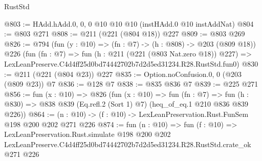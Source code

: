\begin{lexlean}{RustStd}
\begin{coremodule}
@803 := HAdd.hAdd.{0, 0, 0} @10 @10 @10 (instHAdd.{0} @10 instAddNat)
@804 := @803 @271
@808 := @211 (@221 (@804 @18)) @227
@809 := @803 @269
@826 := @794
    (fun (y : @10) => (fn : @7) -> (h : @808) -> @203 (@809 @18))
    @226
    (fun (fn : @7) =>
    fun (h : @211 (@221 (@803 Nat.zero @18)) @227) =>
    LexLeanPreserve.C4d4ff25d0bd74442702b7d2d5ed31234.R28.RustStd.fun0)
@830 := @211 (@221 (@804 @23)) @227
@835 := Option.noConfusion.{0, 0} (@203 (@809 @23)) @7
@836 := @128 @7
@838 := @835 @836 @7
@839 := @225 @271
@856 := fun (x : @10) =>
  @826
    (fun (x : @10) =>
    fun (fn : @7) =>
    fun (h : @830) => @838 @839 (Eq.refl.{2} (Sort 1) @7) (heq_of_eq.{1} @210 @836 @839 @226))
@864 := (n : @10) -> (f : @10) -> LexLeanPreservation.Rust.FunSem @198 @200 @202 @271 @226
@874 := fun (n : @10) =>
  fun (f : @10) =>
  LexLeanPreservation.Rust.simulate
    @198
    @200
    @202
    LexLeanPreserve.C4d4ff25d0bd74442702b7d2d5ed31234.R28.RustStd.crate_ok
    @271
    @226
\end{coremodule}
\end{lexlean}
